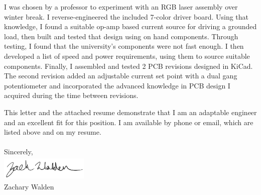 \documentclass{article}
\begin{document}
\begin{adjustwidth}{70pt}{70pt}
\begin{spacing}{1.25}
I was chosen by a professor to experiment with an RGB laser assembly over winter break. I reverse-engineered the included 7-color driver board. Using that knowledge, I found a suitable op-amp based current source for driving a grounded load, then built and tested that design using on hand components. Through testing, I found that the university's components were not fast enough. I then developed a list of speed and power requirements, using them to source suitable components. Finally, I assembled and tested 2 PCB revisions designed in KiCad. The second revision added an adjustable current set point with a dual gang potentiometer and incorporated the advanced knowledge in PCB design I acquired during the time between revisions.

This letter and the attached resume demonstrate that I am an adaptable engineer and an excellent fit for this position.
I am available by phone or email, which are listed  above and on my resume.\\ \\
Sincerely,\\
	\includegraphics[width=4.2cm,height=1.2cm]{signature}
\\Zachary Walden

\vspace*{\fill}
\end{spacing}
\end{adjustwidth}

\newpage
\end{document}
